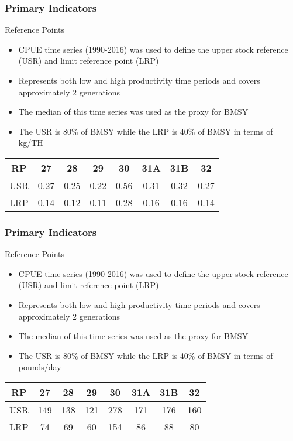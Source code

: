 \documentclass{beamer}
\begin{document}
\begin{frame}
\frametitle{Primary Indicators}
Reference Points
\begin{itemize}
\item CPUE time series (1990-2016) was used to define the upper stock reference (USR) and limit reference point (LRP) 
\item Represents both low and high productivity time periods and covers approximately 2 generations 
\item The median of this time series was used as the proxy for BMSY 
\item The USR is 80\% of BMSY while the LRP is 40\% of BMSY in terms of kg/TH
\end{itemize}
\centering
\begin{tabular}{|c|c|c|c|c|c|c|c|}
\hline
RP & 27 & 28 & 29 & 30 & 31A & 31B & 32 \\
\hline
USR & 0.27 & 0.25 & 0.22 & 0.56 & 0.31 & 0.32 & 0.27 \\
\hline
LRP & 0.14 & 0.12  & 0.11  & 0.28  & 0.16  & 0.16  & 0.14 \\
\hline
\end{tabular}
\end{frame}



\begin{frame}
\frametitle{Primary Indicators}
Reference Points
\begin{itemize}
\item CPUE time series (1990-2016) was used to define the upper stock reference (USR) and limit reference point (LRP) 
\item Represents both low and high productivity time periods and covers approximately 2 generations 
\item The median of this time series was used as the proxy for BMSY 
\item The USR is 80\% of BMSY while the LRP is 40\% of BMSY in terms of pounds/day
\end{itemize}
\centering
\begin{tabular}{|c|c|c|c|c|c|c|c|}
\hline
RP & 27 & 28 & 29 & 30 & 31A & 31B & 32 \\
\hline
USR & 149 & 138 & 121 & 278 & 171 & 176 & 160 \\
\hline
LRP & 74 & 69 & 60 & 154 & 86 & 88 & 80 \\
\hline
\end{tabular}
\end{frame}
\end{document}
